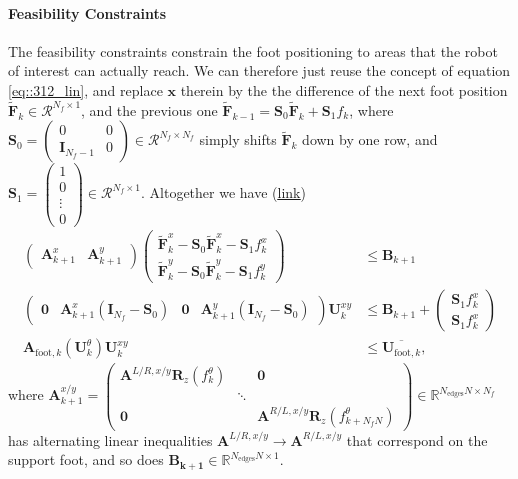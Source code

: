 \paragraph{Feasibility Constraints}
The feasibility constraints constrain the foot positioning to areas that the robot of interest can actually reach. We can therefore just reuse the concept of equation \ref{eq::312_lin}, and replace $\bm{x}$ therein by the the difference of the next foot position $\tilde{\bm{F}}_{k}\in\mathcal{R}^{N_f\times1}$, and the previous one $\tilde{\bm{F}}_{k-1} = \bm{S}_0\tilde{\bm{F}}_{k} + \bm{S}_1f_k$, where $\bm{S}_0 = \begin{pmatrix}0 & 0 \\ \textbf{I}_{N_f-1} & 0
\end{pmatrix}\in\mathcal{R}^{N_f\times N_f}$ simply shifts $\tilde{\bm{F}}_{k}$ down by one row, and $\bm{S}_1 = \begin{pmatrix}
1 \\ 0 \\ \vdots \\ 0
\end{pmatrix}\in\mathcal{R}^{N_f\times1}$. Altogether we have (\href{https://github.com/mhubii/nmpc_pattern_generator/blob/dc1f5a9366cbbbf76f1b02cada642f6ac9a04c89/libs/pattern_generator/src/base_generator.cpp#L1061}{\underline{link}})
\begin{align}
\begin{pmatrix}
\bm{A}_{k+1}^{x}&\bm{A}_{k+1}^{y}\end{pmatrix} 
\begin{pmatrix}
\tilde{\bm{F}}^x_{k} - \bm{S}_0\tilde{\bm{F}}^x_{k} - \bm{S}_1f^x_k\\
\tilde{\bm{F}}^y_{k} - \bm{S}_0\tilde{\bm{F}}^y_{k} - \bm{S}_1f^y_k
\end{pmatrix} &\leq \bm{B}_{k+1} \\
\begin{pmatrix}
\bm{0} & \bm{A}_{k+1}^{x}(\textbf{I}_{N_f}-\bm{S}_0) & \bm{0} & \bm{A}_{k+1}^{y}(\textbf{I}_{N_f}-\bm{S}_0)
\end{pmatrix}\bm{U}_k^{xy} &\leq \bm{B}_{k+1}+\begin{pmatrix}
\bm{S}_1f_k^x \\ \bm{S}_1f_k^x 
\end{pmatrix}\\
\bm{A}_{\text{foot},k}(\bm{U}_k^\theta)\bm{U}_k^{xy} &\leq \overline{\bm{U}_{\text{foot},k}},
\label{eq::312_ineq_foot}
\end{align}
where $\bm{A}_{k+1}^{x/y}=\begin{pmatrix}
	\bm{A}^{L/R,x/y}\bm{R}_z(f_{k}^\theta)& & \bm{0} \\
	&\ddots &\\
	\bm{0} &           &\bm{A}^{R/L,x/y}\bm{R}_z(f_{k+N_fN}^\theta)
\end{pmatrix}\in\mathbb{R}^{N_\text{edges}N\times N_f}$ has alternating linear inequalities $\bm{A}^{L/R,x/y}\rightarrow\bm{A}^{R/L,x/y}$ that correspond on the support foot, and so does $\bm{B_{k+1}}\in\mathbb{R}^{N_\text{edges}N\times1}$. 

